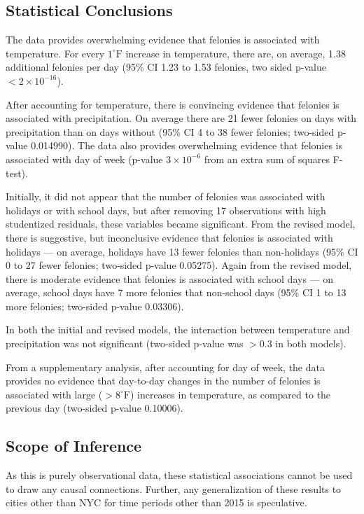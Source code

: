 \documentclass[11pt,notitlepage]{article}
\newcommand{\degf}{^\circ\text{F}}
\begin{document}
\subsection{Statistical Conclusions}

The data provides overwhelming evidence that felonies is associated with temperature. For every $1 \degf$ increase in temperature, there are, on average, 1.38 additional felonies per day (95\% CI 1.23 to 1.53 felonies, two sided p-value $<2\times10^{-16}$).

After accounting for temperature, there is convincing evidence that felonies is associated with precipitation. On average there are 21 fewer felonies on days with precipitation than on days without (95\% CI 4 to 38 fewer felonies; two-sided p-value 0.014990). The data also provides overwhelming evidence that felonies is associated with day of week (p-value $3 \times 10^{-6}$ from an extra sum of squares F-test).

Initially, it did not appear that the number of felonies was associated with holidays or with school days, but after removing 17 observations with high studentized residuals, these variables became significant. From the revised model, there is suggestive, but inconclusive evidence that felonies is associated with holidays --- on average, holidays have 13 fewer felonies than non-holidays (95\% CI 0 to 27 fewer felonies; two-sided p-value 0.05275). Again from the revised model, there is moderate evidence that felonies is associated with school days --- on average, school days have 7 more felonies that non-school days (95\% CI 1 to 13 more felonies; two-sided p-value 0.03306).

In both the initial and revised models, the interaction between temperature and precipitation was not significant (two-sided p-value was $>0.3$ in both models).


From a supplementary analysis, after accounting for day of week, the data provides no evidence that day-to-day changes in the number of felonies is associated with large ($>8 \degf$) increases in temperature, as compared to the previous day (two-sided p-value 0.10006).


\subsection{Scope of Inference}

As this is purely observational data, these statistical associations cannot be used to draw any causal connections. Further, any generalization of these results to cities other than NYC for time periods other than 2015 is speculative.





%
%
\end{document}
